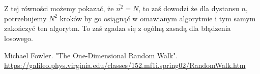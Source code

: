\documentclass[12pt,oneside,a4paper]{book} %
\theoremstyle{break}
\begin{document}
Z tej równości możemy pokazać, że $\overline{n^2} = N$, to zaś dowodzi że dla dystansu $n$, potrzebujemy $N^2$ kroków by go osiągnąć w omawianym algorytmie i tym samym zakończyć ten algorytm. To zaś zgadza się z ogólną zasadą dla błądzenia losowego.

\begin{thebibliography}{00}
  Michael Fowler. "The One-Dimensional Random Walk". \url{https://galileo.phys.virginia.edu/classes/152.mf1i.spring02/RandomWalk.htm}
\end{thebibliography}
\end{document}
